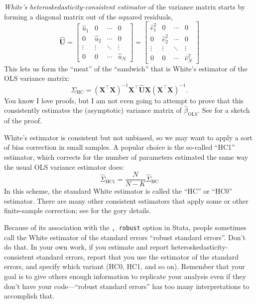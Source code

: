 \documentclass[
  12pt,
  oneside,openany]{book}
\begin{document}
\emph{White's heteroskedasticity-consistent estimator} \citep{white1980heteroskedasticity} of the variance matrix starts by forming a diagonal matrix out of the squared residuals,
\[
\hat{\mathbf{U}}
=
\begin{bmatrix}
\hat{u}_1 & 0 & \cdots & 0 \\
0 & \hat{u}_2 & \cdots & 0 \\
\vdots & \vdots & \ddots & \vdots \\
0 & 0 & \cdots & \hat{u}_N
\end{bmatrix}
=
\begin{bmatrix}
\hat{e}_1^2 & 0 & \cdots & 0 \\
0 & \hat{e}_2^2 & \cdots & 0 \\
\vdots & \vdots & \ddots & \vdots \\
0 & 0 & \cdots & \hat{e}_N^2
\end{bmatrix}
\]
This lets us form the ``meat'' of the ``sandwich'' that is White's estimator of the OLS variance matrix:
\[
\hat{\Sigma}_{\text{HC}}
=
(\mathbf{X}^\top \mathbf{X})^{-1} \mathbf{X}^\top \hat{\mathbf{U}} \mathbf{X} (\mathbf{X}^\top \mathbf{X})^{-1}.
\]
You know I love proofs, but I am not even going to attempt to prove that this consistently estimates the (asymptotic) variance matrix of \(\hat{\beta}_{\text{OLS}}\). See \citet[pp.~198--199]{greene} for a sketch of the proof.

White's estimator is consistent but not unbiased, so we may want to apply a sort of bias correction in small samples. A popular choice is the so-called ``HC1'' estimator, which corrects for the number of parameters estimated the same way the usual OLS variance estimator does:
\[
\hat{\Sigma}_{\text{HC1}} = \frac{N}{N - K} \hat{\Sigma}_{\text{HC}}
\]
In this scheme, the standard White estimator is called the ``HC'' or ``HC0'' estimator. There are many other consistent estimators that apply some or other finite-sample correction; see \citet{mackinnon1985some} for the gory details.

Because of its association with the \texttt{,\ robust} option in Stata, people sometimes call the White estimator of the standard errors ``robust standard errors''. Don't do that. In your own work, if you estimate and report heteroskedasticity-consistent standard errors, report that you use the \citet{white1980heteroskedasticity} estimator of the standard errors, and specify which variant (HC0, HC1, and so on). Remember that your goal is to give others enough information to replicate your analysis even if they don't have your code---``robust standard errors'' has too many interpretations to accomplish that.
\end{document}
